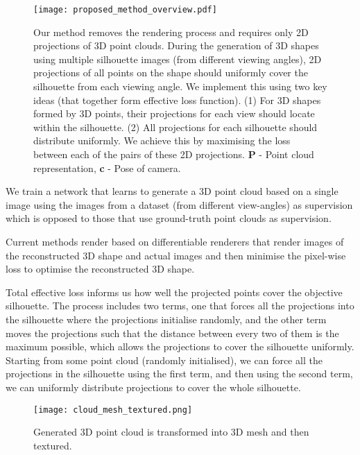 \documentclass[runningheads]{llncs}
\begin{document}
\begin{figure*}[h]
\centering
\setlength{\abovecaptionskip}{3pt}
 \texttt{[image: proposed\_method\_overview.pdf]}
 \caption{Our method removes the rendering process and requires only 2D projections of 3D point clouds. During the generation of 3D shapes using multiple silhouette images (from different viewing angles), 2D projections of all points on the shape should uniformly cover the silhouette from each viewing angle. We implement this using two key ideas (that together form effective loss function). (1) For 3D shapes formed by 3D points, their projections for each view should locate within the silhouette. (2) All projections for each silhouette should distribute uniformly. We achieve this by maximising the loss between each of the pairs of these 2D projections. \textbf{P} - Point cloud representation, \textbf{c} - Pose of camera.} 
\label{fig:proposed_method_overview}
\end{figure*}

We train a network that learns to generate a 3D point cloud based on a single image using the images from a dataset (from different view-angles) as supervision which is opposed to those that use ground-truth point clouds as supervision. 

Current methods render based on differentiable renderers that render images of the reconstructed 3D shape and actual images and then minimise the pixel-wise loss to optimise the reconstructed 3D shape.

Total effective loss informs us how well the projected points cover the objective silhouette. The process includes two terms, one that forces all the projections into the silhouette where the projections initialise randomly, and the other term moves the projections such that the distance between every two of them is the maximum possible, which allows the projections to cover the silhouette uniformly. Starting from some point cloud (randomly initialised), we can force all the projections in the silhouette using the first term, and then using the second term, we can uniformly distribute projections to cover the whole silhouette.

\begin{figure*}[h]
\centering
\setlength{\abovecaptionskip}{3pt}
 \texttt{[image: cloud\_mesh\_textured.png]}
 \caption{Generated 3D point cloud is transformed into 3D mesh and then textured.} 
\label{fig:cloud_mesh_textured}
\end{figure*}
\end{document}
